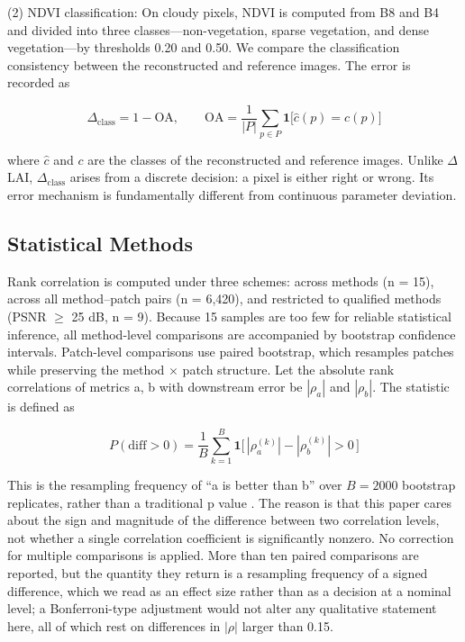 \documentclass[a4paper,fleqn]{cas-dc}
\begin{document}
(2) NDVI classification: On cloudy pixels, NDVI is computed from B8 and B4 and divided into three classes---non-vegetation, sparse vegetation, and dense vegetation---by thresholds 0.20 and 0.50. We compare the classification consistency between the reconstructed and reference images. The error is recorded as

\begin{equation}
\Delta_{\mathrm{class}}=1-\mathrm{OA},\qquad
\mathrm{OA}=\frac{1}{|P|}\sum_{p\in P}
\mathbf{1}\bigl[\hat{c}(p)=c(p)\bigr]
\label{eq:oa}
\end{equation}

where $\hat{c}$ and $c$ are the classes of the reconstructed and reference images. Unlike $\Delta$LAI, $\Delta_{\mathrm{class}}$ arises from a discrete decision: a pixel is either right or wrong. Its error mechanism is fundamentally different from continuous parameter deviation.

\subsection{Statistical Methods}

Rank correlation is computed under three schemes: across methods (n = 15), across all method--patch pairs (n = 6,420), and restricted to qualified methods (PSNR $\geq$ 25 dB, n = 9). Because 15 samples are too few for reliable statistical inference, all method-level comparisons are accompanied by bootstrap confidence intervals. Patch-level comparisons use paired bootstrap, which resamples patches while preserving the method $\times$ patch structure. Let the absolute rank correlations of metrics a, b with downstream error be $|\rho_a|$ and $|\rho_b|$. The statistic is defined as

\begin{equation}
P(\text{diff}>0)=\frac{1}{B}\sum_{k=1}^{B}
\mathbf{1}\bigl[\,|\rho_{a}^{(k)}|-|\rho_{b}^{(k)}|>0\,\bigr]
\label{eq:boot}
\end{equation}

This is the resampling frequency of ``a is better than b'' over $B=2000$ bootstrap replicates, rather than a traditional p value \cite{ref11}. The reason is that this paper cares about the sign and magnitude of the difference between two correlation levels, not whether a single correlation coefficient is significantly nonzero. No correction for multiple comparisons is applied. More than ten paired comparisons are reported, but the quantity they return is a resampling frequency of a signed difference, which we read as an effect size rather than as a decision at a nominal level; a Bonferroni-type adjustment would not alter any qualitative statement here, all of which rest on differences in $|\rho|$ larger than 0.15.
\end{document}
